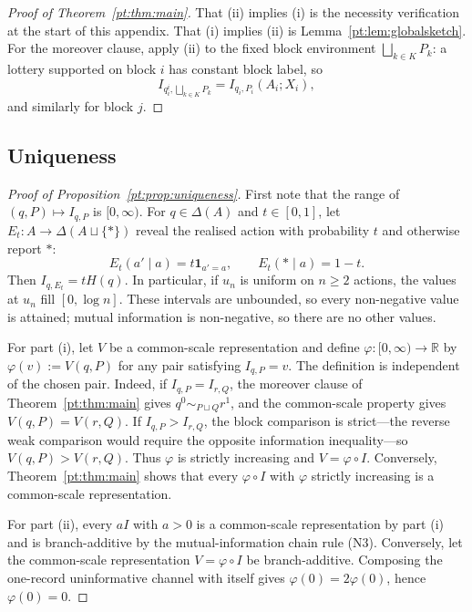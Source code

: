 \documentclass[11pt,a4paper]{article}
\theoremstyle{definition}
\newcommand{\Sh}{H}
\newcommand{\R}{\mathbb R}
\newcommand{\1}{\mathbf 1}
\begin{document}
\begin{proof}[Proof of Theorem~\ref{pt:thm:main}]
That \textup{(ii)} implies \textup{(i)} is the necessity verification at the start of this appendix.  That
\textup{(i)} implies \textup{(ii)} is Lemma~\ref{pt:lem:globalsketch}.  For the moreover clause, apply \textup{(ii)} to
the fixed block environment $\bigsqcup_{k\in K}P_k$: a lottery supported on block $i$ has constant block label, so
\[
I_{q_i^i,\bigsqcup_{k\in K}P_k}=I_{q_i,P_i}(A_i;X_i),
\]
and similarly for block $j$.
\end{proof}

\subsection{Uniqueness}

\begin{proof}[Proof of Proposition~\ref{pt:prop:uniqueness}]
First note that the range of $(q,P)\mapsto I_{q,P}$ is $[0,\infty)$.  For $q\in\Delta(A)$ and $t\in[0,1]$, let
$E_t:A\to\Delta(A\sqcup\{*\})$ reveal the realised action with probability $t$ and otherwise report $*$:
\[
E_t(a'\mid a)=t\1_{a'=a},
\qquad
E_t(*\mid a)=1-t.
\]
Then $I_{q,E_t}=t\Sh(q)$.  In particular, if $u_n$ is uniform on $n\ge2$ actions, the values at $u_n$ fill
$[0,\log n]$.  These intervals are unbounded, so every non-negative value is attained; mutual information is
non-negative, so there are no other values.

For part \textup{(i)}, let $V$ be a common-scale representation and define
$\varphi:[0,\infty)\to\R$ by $\varphi(v):=V(q,P)$ for any pair satisfying $I_{q,P}=v$.  The definition is independent
of the chosen pair.  Indeed, if $I_{q,P}=I_{r,Q}$, the moreover clause of Theorem~\ref{pt:thm:main} gives
$q^0\sim_{P\sqcup Q}r^1$, and the common-scale property gives $V(q,P)=V(r,Q)$.  If
$I_{q,P}>I_{r,Q}$, the block comparison is strict---the reverse weak comparison would require the opposite
information inequality---so $V(q,P)>V(r,Q)$.  Thus $\varphi$ is strictly increasing and $V=\varphi\circ I$.
Conversely, Theorem~\ref{pt:thm:main} shows that every $\varphi\circ I$ with $\varphi$ strictly increasing is a
common-scale representation.

For part \textup{(ii)}, every $aI$ with $a>0$ is a common-scale representation by part \textup{(i)} and is
branch-additive by the mutual-information chain rule (N3).  Conversely, let the common-scale representation
$V=\varphi\circ I$ be branch-additive.  Composing the one-record uninformative channel with itself gives
$\varphi(0)=2\varphi(0)$, hence $\varphi(0)=0$.


\end{proof}
\end{document}
